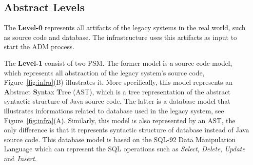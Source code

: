 \subsection{Abstract Levels}\label{subsection:abstract_level}
The \textbf{Level-0} represents all artifacts of the legacy systems in the real world, such as source code and database. The infrastructure uses this artifacts as input to start the ADM process.

The \textbf{Level-1} consist of two PSM. The former model is a source code model, which represents all abstraction of the legacy system's source code, Figure~\ref{fig:infra}(B) illustrates it. More specifically, this model represents an \textbf{A}bstract \textbf{S}yntax \textbf{T}ree (AST), which is a tree representation of the abstract syntactic structure of Java source code. The latter is a database model that illustrates informations related to database used in the legacy system, see Figure~\ref{fig:infra}(A). Similarly, this model is also represented by an AST, the only difference is that it represents syntactic structure of database instead of Java source code. This database model is based on the SQL-92 Data Manipulation Language which can represent the SQL operations such as \textit{Select}, \textit{Delete}, \textit{Update} and \textit{Insert}. %



